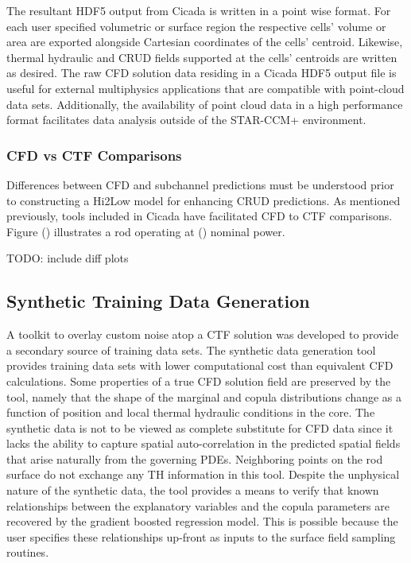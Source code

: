 The resultant HDF5 output from Cicada is written in a point wise format.  For each user specified volumetric or surface region the respective cells' volume or area are exported alongside Cartesian coordinates of the cells' centroid.  Likewise, thermal hydraulic and CRUD fields supported at the cells' centroids are written as desired.  The raw CFD solution data residing in a Cicada HDF5 output file is useful for external multiphysics applications that are compatible with point-cloud data sets.  Additionally, the availability of point cloud data in a high performance format facilitates data analysis outside of the STAR-CCM+ environment.  

\subsubsection*{CFD vs CTF Comparisons}

Differences between CFD and subchannel predictions must be understood prior to constructing a Hi2Low model for enhancing CRUD predictions.  As mentioned previously, tools included in Cicada have facilitated CFD to CTF comparisons.  Figure () illustrates a rod operating at () nominal power.

TODO: include diff plots

\subsection{Synthetic Training Data Generation}
\label{chap:synth}

A toolkit to overlay custom noise atop a CTF solution was developed to provide a secondary source of training data sets.  The synthetic data generation tool provides training data sets with lower computational cost than equivalent CFD calculations.  Some properties of a true CFD solution field are preserved by the tool, namely that the shape of the marginal and copula distributions change as a function of position and local thermal hydraulic conditions in the core.  The synthetic data is not to be viewed as complete substitute for CFD data since it lacks the ability to capture spatial auto-correlation in the predicted spatial fields that arise naturally from the governing PDEs.  Neighboring points on the rod surface do not exchange any TH information in this tool.  Despite the unphysical nature of the synthetic data, the tool provides a means to verify that known relationships between the explanatory variables and the copula parameters are recovered by the gradient boosted regression model.  This is possible because the user specifies these relationships up-front as inputs to the surface field sampling routines. \\

